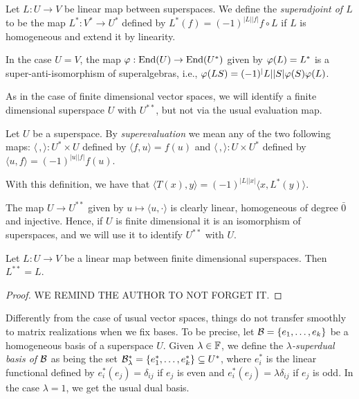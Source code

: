 \documentclass{amsbook}
\begin{document}
\begin{defi}
    Let $L: U \to V$ be linear map between superspaces.
    We define the \emph{superadjoint of $L$} to be the map $L^*: V^* \to U^*$ defined by $L^*(f) = (-1)^{|L||f|} f \circ L$ if $L$ is homogeneous and extend it by linearity.
\end{defi}

In the case $U = V$, the map $\varphi: \operatorname{End}(U) \to \operatorname{End}(U^*)$ given by $\varphi(L) = L^*$ is a super-anti-isomorphism of superalgebras, i.e., $\varphi (LS) = (-1)^|L||S| \varphi(S) \varphi(L)$.

As in the case of finite dimensional vector spaces, we will identify a finite dimensional superspace $U$ with $U^{**}$, but not via the usual evaluation map.

\begin{defi}
    Let $U$ be a superspace. By \emph{superevaluation} we mean any of the two following maps: $ \langle\, ,\rangle : U^* \times U$ defined by $\langle f, u\rangle = f(u)$ and  $ \langle\, ,\rangle : U \times U^*$ defined by $\langle u, f\rangle = (-1)^{|u||f|}f(u)$. 
\end{defi}

With this definition, we have that $\langle T(x), y\rangle = (-1)^{|L||x|}\langle x, L^* (y)\rangle$.

The map $U \to U^{**}$ given by $u \mapsto  \langle u , \cdot \rangle$ is clearly linear, homogeneous of degree $\bar 0$ and injective. Hence, if $U$ is finite dimensional it is an isomorphism of superspaces, and we will use it to identify $U^{**}$ with $U$.

\begin{prop}\label{prop:superadjunction-is-involutive}
    Let $L: U \to V$ be a linear map between finite dimensional superspaces. Then $L^{**} = L$.
\end{prop}

\begin{proof}
    WE REMIND THE AUTHOR TO NOT FORGET IT.
\end{proof}

Differently from the case of usual vector spaces, things do not transfer smoothly to matrix realizations when we fix bases. To be precise, let $\mathcal B = \{e_1, \ldots, e_k\}$ be a homogeneous basis of a superspace $U$. Given $\lambda \in \mathbb{F}$, we define the \emph{$\lambda$-superdual basis of $\mathcal B$} as being the set $\mathcal B^*_\lambda = \{e_1^*, \ldots, e_k^*\} \subseteq U^*$, where $e_i^*$ is the linear functional defined by $e_i^*(e_j) = \delta_{ij}$ if $e_j$ is even and $e_i^*(e_j) = \lambda \delta_{ij}$ if $e_j$ is odd. In the case $\lambda = 1$, we get the usual dual basis.
\end{document}
